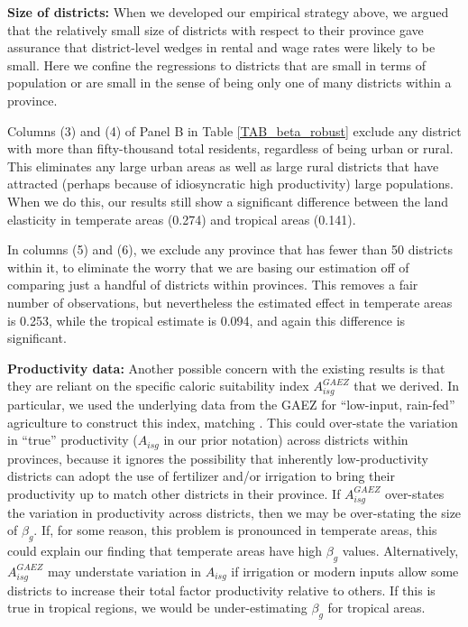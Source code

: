 \documentclass[11pt]{article}
\begin{document}
\vspace{.5cm}\noindent\textbf{Size of districts:} When we developed our empirical strategy above, we argued that the relatively small size of districts with respect to their province gave assurance that district-level wedges in rental and wage rates were likely to be small. Here we confine the regressions to districts that are small in terms of population or are small in the sense of being only one of many districts within a province. 

Columns (3) and (4) of Panel B in Table \ref{TAB_beta_robust} exclude any district with more than fifty-thousand total residents, regardless of being urban or rural. This eliminates any large urban areas as well as large rural districts that have attracted (perhaps because of idiosyncratic high productivity) large populations. When we do this, our results still show a significant difference between the land elasticity in temperate areas (0.274) and tropical areas (0.141). 

In columns (5) and (6), we exclude any province that has fewer than 50 districts within it, to eliminate the worry that we are basing our estimation off of comparing just a handful of districts within provinces. This removes a fair number of observations, but nevertheless the estimated effect in temperate areas is 0.253, while the tropical estimate is 0.094, and again this difference is significant.

\vspace{.5cm}\noindent\textbf{Productivity data:} Another possible concern with the existing results is that they are reliant on the specific caloric suitability index $A_{isg}^{GAEZ}$ that we derived. In particular, we used the underlying data from the GAEZ for ``low-input, rain-fed'' agriculture to construct this index, matching \cite{galorozak2016}. This could over-state the variation in ``true'' productivity ($A_{isg}$ in our prior notation) across districts within provinces, because it ignores the possibility that inherently low-productivity districts can adopt the use of fertilizer and/or irrigation to bring their productivity up to match other districts in their province. If $A_{isg}^{GAEZ}$ over-states the variation in productivity across districts, then we may be over-stating the size of $\beta_g$. If, for some reason, this problem is pronounced in temperate areas, this could explain our finding that temperate areas have high $\beta_g$ values. Alternatively, $A_{isg}^{GAEZ}$ may understate variation in $A_{isg}$ if irrigation or modern inputs allow some districts to increase their total factor productivity relative to others. If this is true in tropical regions, we would be under-estimating $\beta_g$ for tropical areas.
\end{document}
